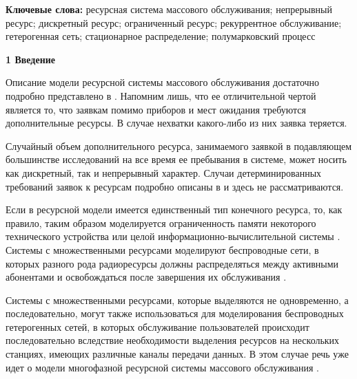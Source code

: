\documentclass[a4paper,12pt]{article}
\begin{document}
\vspace{\baselineskip}     %



\noindent

\textbf{Ключевые слова:} ресурсная система массового обслуживания; непрерывный ресурс; дискретный ресурс; ограниченный ресурс; рекуррентное обслуживание; гетерогенная сеть; стационарное распределение; полумарковский процесс





\vspace{\baselineskip}     %



\noindent                  %

\textbf{1 Введение}



Описание модели ресурсной системы массового обслуживания достаточно подробно представлено в \cite{Ch_1}. Напомним лишь, что ее отличительной чертой является то, что заявкам помимо приборов и мест ожидания требуются дополнительные ресурсы. В случае нехватки какого-либо из них заявка теряется.

Случайный объем дополнительного ресурса, занимаемого заявкой в подавляющем большинстве исследований на все время ее пребывания в системе, может носить как дискретный, так и непрерывный характер. Случаи детерминированных требований заявок к ресурсам подробно описаны в \cite{Kelly,Ross,Basharin} и здесь не рассматриваются.



Если в ресурсной модели имеется единственный тип конечного ресурса, то, как правило, таким образом моделируется ограниченность памяти некоторого технического устройства или целой информационно-вычислительной системы \cite{Romm_21_1971,Kac,Tihonenko_27_1985,Pechinkin_29_2012}. Системы с множественными ресурсами моделируют беспроводные сети, в которых разного рода радиоресурсы должны распределяться между активными абонентами и освобождаться после завершения  их обслуживания \cite{Naumov_3_2016}.

Системы с множественными ресурсами, которые выделяются не одновременно, а последовательно, могут также использоваться для моделирования беспроводных гетерогенных сетей, в которых обслуживание пользователей происходит последовательно вследствие необходимости выделения ресурсов на нескольких станциях, имеющих различные каналы передачи данных. В этом случае речь уже идет о модели многофазной ресурсной системы массового обслуживания \cite{Mois_4_2017,Mois_5_2017}.
\end{document}
